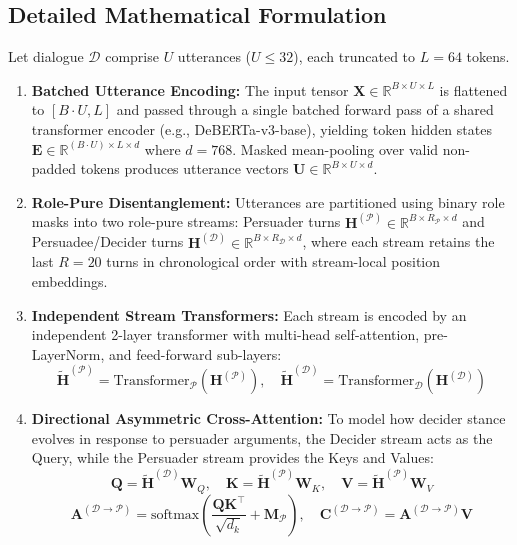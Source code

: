 \subsection{Detailed Mathematical Formulation}
Let dialogue $\mathcal{D}$ comprise $U$ utterances ($U \le 32$), each truncated to $L=64$ tokens.
\begin{enumerate}
  \item \textbf{Batched Utterance Encoding:} The input tensor $\mathbf{X} \in \mathbb{R}^{B \times U \times L}$ is flattened to $[B \cdot U, L]$ and passed through a single batched forward pass of a shared transformer encoder (e.g., DeBERTa-v3-base), yielding token hidden states $\mathbf{E} \in \mathbb{R}^{(B \cdot U) \times L \times d}$ where $d=768$. Masked mean-pooling over valid non-padded tokens produces utterance vectors $\mathbf{U} \in \mathbb{R}^{B \times U \times d}$.
  \item \textbf{Role-Pure Disentanglement:} Utterances are partitioned using binary role masks into two role-pure streams: Persuader turns $\mathbf{H}^{(\mathcal{P})} \in \mathbb{R}^{B \times R_{\mathcal{P}} \times d}$ and Persuadee/Decider turns $\mathbf{H}^{(\mathcal{D})} \in \mathbb{R}^{B \times R_{\mathcal{D}} \times d}$, where each stream retains the last $R=20$ turns in chronological order with stream-local position embeddings.
  \item \textbf{Independent Stream Transformers:} Each stream is encoded by an independent 2-layer transformer with multi-head self-attention, pre-LayerNorm, and feed-forward sub-layers:
    \begin{equation}
      \widetilde{\mathbf{H}}^{(\mathcal{P})} = \text{Transformer}_{\mathcal{P}}(\mathbf{H}^{(\mathcal{P})}), \quad \widetilde{\mathbf{H}}^{(\mathcal{D})} = \text{Transformer}_{\mathcal{D}}(\mathbf{H}^{(\mathcal{D})})
    \end{equation}
  \item \textbf{Directional Asymmetric Cross-Attention:} To model how decider stance evolves in response to persuader arguments, the Decider stream acts as the Query, while the Persuader stream provides the Keys and Values:
    \begin{equation}
      \mathbf{Q} = \widetilde{\mathbf{H}}^{(\mathcal{D})} \mathbf{W}_Q, \quad \mathbf{K} = \widetilde{\mathbf{H}}^{(\mathcal{P})} \mathbf{W}_K, \quad \mathbf{V} = \widetilde{\mathbf{H}}^{(\mathcal{P})} \mathbf{W}_V
    \end{equation}
    \begin{equation}
      \mathbf{A}^{(\mathcal{D} \to \mathcal{P})} = \text{softmax}\left(\frac{\mathbf{Q} \mathbf{K}^\top}{\sqrt{d_k}} + \mathbf{M}_{\mathcal{P}}\right), \quad \mathbf{C}^{(\mathcal{D} \to \mathcal{P})} = \mathbf{A}^{(\mathcal{D} \to \mathcal{P})} \mathbf{V}

\end{equation}
\end{enumerate}
